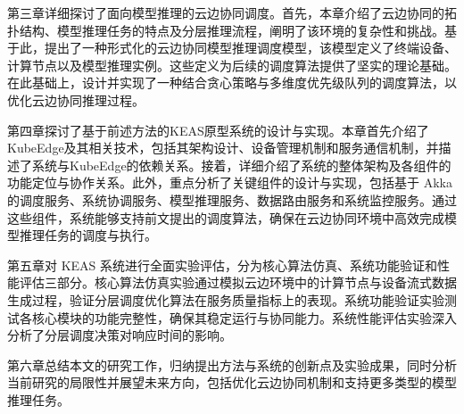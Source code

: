 第三章详细探讨了面向模型推理的云边协同调度。首先，本章介绍了云边协同的拓扑结构、模型推理任务的特点及分层推理流程，阐明了该环境的复杂性和挑战。基于此，提出了一种形式化的云边协同模型推理调度模型，该模型定义了终端设备、计算节点以及模型推理实例。这些定义为后续的调度算法提供了坚实的理论基础。在此基础上，设计并实现了一种结合贪心策略与多维度优先级队列的调度算法，以优化云边协同推理过程。

第四章探讨了基于前述方法的KEAS原型系统的设计与实现。本章首先介绍了KubeEdge及其相关技术，包括其架构设计、设备管理机制和服务通信机制，并描述了系统与KubeEdge的依赖关系。接着，详细介绍了系统的整体架构及各组件的功能定位与协作关系。此外，重点分析了关键组件的设计与实现，包括基于 Akka 的调度服务、系统协调服务、模型推理服务、数据路由服务和系统监控服务。通过这些组件，系统能够支持前文提出的调度算法，确保在云边协同环境中高效完成模型推理任务的调度与执行。

第五章对 KEAS 系统进行全面实验评估，分为核心算法仿真、系统功能验证和性能评估三部分。核心算法仿真实验通过模拟云边环境中的计算节点与设备流式数据生成过程，验证分层调度优化算法在服务质量指标上的表现。系统功能验证实验测试各核心模块的功能完整性，确保其稳定运行与协同能力。系统性能评估实验深入分析了分层调度决策对响应时间的影响。

第六章总结本文的研究工作，归纳提出方法与系统的创新点及实验成果，同时分析当前研究的局限性并展望未来方向，包括优化云边协同机制和支持更多类型的模型推理任务。
